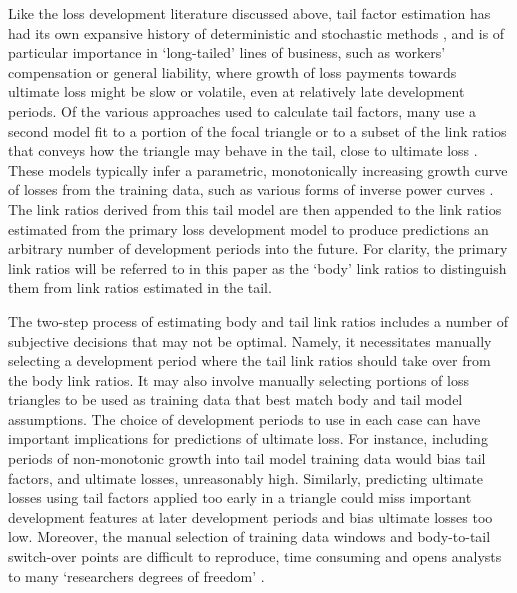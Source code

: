 Like the loss development literature discussed above, 
tail factor estimation has had its own expansive history
of deterministic and stochastic methods \citep{tailfactors2013}, and is of particular
importance in `long-tailed' lines of business, such as workers' compensation or general
liability, where growth of loss payments towards ultimate loss might be slow or
volatile, 
even at relatively late development periods.
Of the various approaches used to calculate tail factors, many 
use a second model fit to a portion
of the focal triangle or to a subset of the link ratios
that conveys how the triangle may behave
in the tail, close to ultimate loss \citep{tailfactors2013}.
These models typically 
infer a parametric, monotonically
increasing growth curve of losses from the training data, 
such as various forms of
inverse power curves \citep[e.g.][]{sherman1984,evans2015,clark2017}.
The link ratios derived from this tail model are then appended to
the link ratios estimated from the primary loss development model
to produce predictions an
arbitrary number of development periods into the future.
For clarity, the primary link ratios will be referred to
in this paper as the `body' link ratios to distinguish them from 
link ratios estimated in the tail.

The two-step process of estimating body and tail link ratios
includes a number of 
subjective decisions that may not be optimal. 
Namely, it necessitates manually selecting a development 
period where the tail link ratios should take over from
the body link ratios. It may also involve manually selecting portions of
loss triangles to be used as training data that best match
body and tail model assumptions.
The choice of development periods to use in each case
can have important implications for predictions of ultimate
loss.
For instance, including periods
of non-monotonic growth into tail model training
data would bias
tail factors, and ultimate losses, unreasonably high. 
Similarly, predicting
ultimate losses using tail factors applied too early
in a triangle
could miss important development features at later
development periods and bias ultimate losses too low. 
Moreover, the manual selection of training data windows
and body-to-tail switch-over points
are difficult to reproduce, time consuming and
opens analysts to many `researchers degrees of freedom' \citep{simmons2011}.

